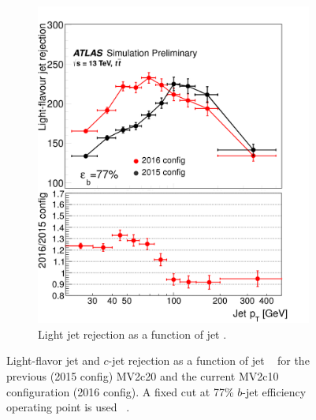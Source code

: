 \begin{figure}[htbp!]
\begin{subfigure}[b]{0.4\textwidth}
        \includegraphics[width=\textwidth]{figures/object/light_rej_pt}
        \caption{Light jet rejection as a function of jet \pt.}
        \label{fig:obj_light_rej}
    \end{subfigure}
\caption{Light-flavor jet and $c$-jet rejection as a function of jet \pt~ for the previous (2015 config) MV2c20 and the current MV2c10 configuration (2016 config). A fixed cut at 77\% $b$-jet efficiency operating point is used ~\cite{btaggingRun2}.}
\label{fig:obj_btag_rej}
\end{figure}


